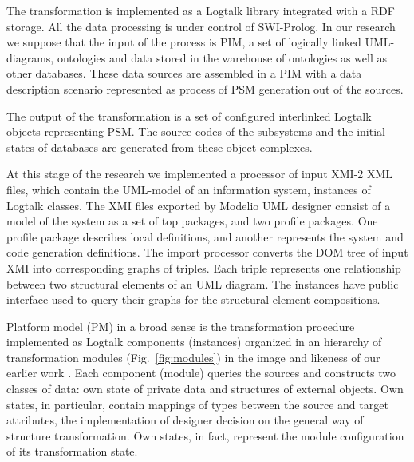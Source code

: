 \documentclass[conference,a4paper]{IEEEtran}
\begin{document}
The transformation is implemented as a Logtalk library integrated with a RDF storage.  All the data processing is under control of SWI-Prolog.  In our research we suppose that the input of the process is PIM, a set of logically linked UML-diagrams, ontologies and data stored in the warehouse of ontologies as well as other databases.  These data sources are assembled in a PIM with a data description scenario represented as process of PSM generation out of the sources.

The output of the transformation is a set of configured interlinked Logtalk objects representing PSM.  The source codes of the subsystems and the initial states of databases are generated from these object complexes.

At this stage of the research we implemented a processor of input XMI-2 XML files, which contain the UML-model of an information system, instances of Logtalk classes.  The XMI files exported by Modelio UML designer consist of a model of the system as a set of top packages, and two profile packages.  One profile package describes local definitions, and another represents the system and code generation definitions.  The import processor converts the DOM tree of input XMI into corresponding graphs of triples.  Each triple represents one relationship between two structural elements of an UML diagram.  The instances have public interface used to query their graphs for the structural element compositions.

Platform model (PM) in a broad sense is the transformation procedure implemented as Logtalk components (instances) organized in an hierarchy of transformation modules (Fig.~\ref{fig:modules}) in the image and likeness of our earlier work \cite{tereh1}.  Each component (module) queries the sources and constructs two classes of data: own state of private data and structures of external objects.  Own states, in particular, contain mappings of types between the source and target attributes, the implementation of designer decision on the general way of structure transformation.  Own states, in fact, represent the module configuration of its transformation state.
\end{document}
